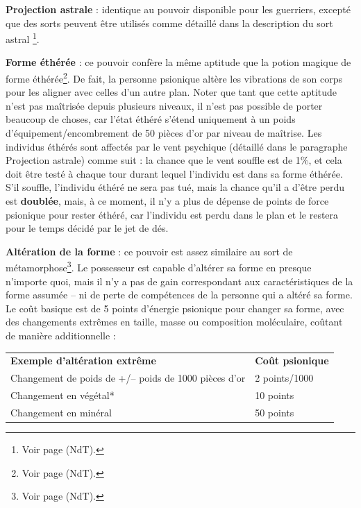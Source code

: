 {\bigskip

\textbf{Projection astrale} : identique au pouvoir disponible pour les guerriers, excepté que des sorts peuvent être utilisés comme détaillé dans la description du \og sort astral \fg{}\footnote{Voir page \pageref{sort-astral} (NdT).}.

\bigskip

\textbf{Forme éthérée} : ce pouvoir confère la même aptitude que la potion magique de forme éthérée\footnote{Voir page \pageref{objet-huile-etheree} (NdT).}. De fait, la personne psionique altère les vibrations de son corps pour les aligner avec celles d'un autre plan. Noter que tant que cette aptitude n'est pas maîtrisée depuis plusieurs niveaux, il n'est pas possible de porter beaucoup de choses, car l'état éthéré s'étend uniquement à un poids d'équipement/encombrement de 50 pièces d'or par niveau de maîtrise. Les individus éthérés sont affectés par le vent psychique (détaillé dans le paragraphe Projection astrale) comme suit : la chance que le vent souffle est de 1\%, et cela doit être testé à chaque tour durant lequel l'individu est dans sa forme éthérée. S'il souffle, l'individu éthéré ne sera pas tué, mais la chance qu'il a d'être perdu est \textbf{doublée}, mais, à ce moment, il n'y a plus de dépense de points de force psionique pour rester éthéré, car l'individu est perdu dans le plan et le restera pour le temps décidé par le jet de dés.

\bigskip

\textbf{Altération de la forme} : ce pouvoir est assez similaire au sort de métamorphose\footnote{Voir page \pageref{sort-metamorphose} (NdT).}. Le possesseur est capable d'altérer sa forme en presque n'importe quoi, mais il n'y a pas de gain correspondant aux caractéristiques de la forme assumée -- ni de perte de compétences de la personne qui a altéré sa forme. Le coût basique est de 5 points d'énergie psionique pour changer sa forme, avec des changements extrêmes en taille, masse ou composition moléculaire, coûtant de manière additionnelle :

\bigskip

\begin{tabular}{p{10cm}l}
\textbf{Exemple d'altération extrême} & \textbf{Coût psionique} \\
Changement de poids de +/-- poids de 1000 pièces d'or & 2 points/1000 \\
Changement en végétal* & 10 points \\
Changement en minéral & 50 points \\
\end{tabular}

}
